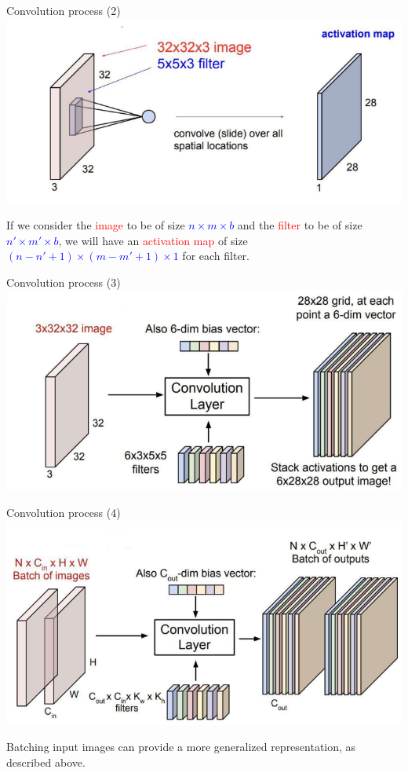 \documentclass[default, aspectratio=169]{beamer}
\begin{document}
	\begin{frame}{Convolution process (2)}
		\centering
		\includegraphics[keepaspectratio, scale=0.75]{pic/img5.png}
		\smallskip
		\begin{flushleft}
			If we consider the \textcolor{red}{image} to be of size \textcolor{blue}{\( n \times m \times b \)} and the \textcolor{red}{filter} to be of size \textcolor{blue}{\( n' \times m' \times b \)}, we will have an \textcolor{red}{activation map} of size \textcolor{blue}{\( (n - n' + 1) \times (m - m' + 1) \times 1 \)} for each filter.
		\end{flushleft}
		
	\end{frame}
	\begin{frame}{Convolution process (3)}
		\centering
		\includegraphics[keepaspectratio, scale=0.8]{pic/img6.png}
	\end{frame}
	\begin{frame}{Convolution process (4)}
		\centering
		\includegraphics[keepaspectratio, scale=0.7]{pic/img7.png}
		\smallskip
		\begin{flushleft}
			Batching input images can provide a more generalized representation, as described above.
		\end{flushleft}		
	\end{frame}
\end{document}
